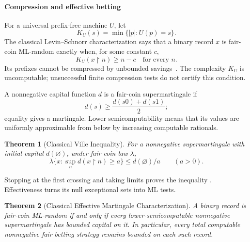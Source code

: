 \documentclass[aps,pra,reprint,superscriptaddress,amsmath,amssymb,floatfix]{revtex4-2}
\theoremstyle{plain}
\newtheorem{theorem}{Theorem}
\theoremstyle{definition}
\theoremstyle{remark}
\begin{document}
\paragraph{Compression and effective betting}

For a universal prefix-free machine \(U\), let
\begin{equation}
  K_U(s)=\min\{|p|:U(p)=s\}.
  \label{eq:prefixcomplexity}
\end{equation}
The classical Levin--Schnorr characterization says that a binary record \(x\)
is fair-coin ML-random exactly when, for some constant \(c\),
\begin{equation}
  K_U(x{\upharpoonright}n)\geq n-c\quad\text{for every }n.
  \label{eq:levinschnorr}
\end{equation}
Its prefixes cannot be compressed by unbounded savings~\cite{Chaitin-1974,calude:02,Nies2009}.
The complexity \(K_U\) is uncomputable; unsuccessful finite compression tests
do not certify this condition.

A nonnegative capital function \(d\) is a fair-coin supermartingale if
\begin{equation}
  d(s)\geq\frac{d(s0)+d(s1)}2;
  \label{eq:computablemartingale}
\end{equation}
equality gives a martingale. Lower semicomputability means that its values
are uniformly approximable from below by increasing computable rationals.

\begin{theorem}[Classical Ville Inequality]
  \label{thm:ville}
  For a nonnegative supermartingale with initial capital \(d(\varnothing)\),
  under fair-coin law \(\lambda\),
  \begin{equation}
    \lambda\{x:\sup_n d(x{\upharpoonright}n)\geq a\}
    \leq d(\varnothing)/a\qquad(a>0).
    \label{eq:ville}
  \end{equation}
\end{theorem}

Stopping at the first crossing and taking limits proves the inequality
\cite{Ville1939}. Effectiveness turns its null exceptional sets into ML tests.

\begin{theorem}[Classical Effective Martingale Characterization]
  \label{thm:effective}
  A binary record is fair-coin ML-random if and only if every
  lower-semicomputable nonnegative supermartingale has bounded capital on it.
  In particular, every total computable nonnegative fair betting strategy
  remains bounded on each such record.
\end{theorem}
\end{document}
